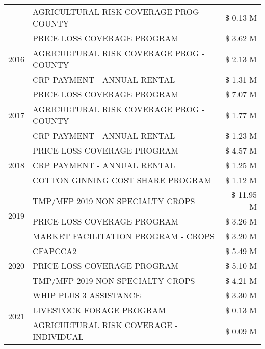 \begin{tabular}{llr}
 & AGRICULTURAL RISK COVERAGE PROG - COUNTY & \$ 0.13 M \\
\cline{1-3}
\multirow[t]{3}{*}{2016} & PRICE LOSS COVERAGE PROGRAM & \$ 3.62 M \\
 & AGRICULTURAL RISK COVERAGE PROG - COUNTY & \$ 2.13 M \\
 & CRP PAYMENT - ANNUAL RENTAL & \$ 1.31 M \\
\cline{1-3}
\multirow[t]{3}{*}{2017} & PRICE LOSS COVERAGE PROGRAM & \$ 7.07 M \\
 & AGRICULTURAL RISK COVERAGE PROG - COUNTY & \$ 1.77 M \\
 & CRP PAYMENT - ANNUAL RENTAL & \$ 1.23 M \\
\cline{1-3}
\multirow[t]{3}{*}{2018} & PRICE LOSS COVERAGE PROGRAM & \$ 4.57 M \\
 & CRP PAYMENT - ANNUAL RENTAL & \$ 1.25 M \\
 & COTTON GINNING COST SHARE PROGRAM & \$ 1.12 M \\
\cline{1-3}
\multirow[t]{3}{*}{2019} & TMP/MFP 2019 NON SPECIALTY CROPS & \$ 11.95 M \\
 & PRICE LOSS COVERAGE PROGRAM & \$ 3.26 M \\
 & MARKET FACILITATION PROGRAM - CROPS & \$ 3.20 M \\
\cline{1-3}
\multirow[t]{3}{*}{2020} & CFAPCCA2 & \$ 5.49 M \\
 & PRICE LOSS COVERAGE PROGRAM & \$ 5.10 M \\
 & TMP/MFP 2019 NON SPECIALTY CROPS & \$ 4.21 M \\
\cline{1-3}
\multirow[t]{3}{*}{2021} & WHIP PLUS 3 ASSISTANCE & \$ 3.30 M \\
 & LIVESTOCK FORAGE PROGRAM & \$ 0.13 M \\
 & AGRICULTURAL RISK COVERAGE - INDIVIDUAL & \$ 0.09 M \\
\cline{1-3}
\bottomrule
\end{tabular}

